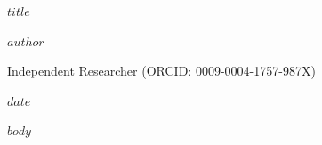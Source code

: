 \documentclass[11pt,letterpaper]{article}
\theoremstyle{definition}
\begin{document}
\thispagestyle{plain}
\begin{center}
{\fontsize{17.5}{22}\selectfont\bfseries $title$\par}
\vspace{11pt}
{\large $author$\par}
\vspace{3pt}
{\small Independent Researcher (ORCID: \href{https://orcid.org/0009-0004-1757-987X}{0009-0004-1757-987X})\par}
\vspace{5pt}
{\small $date$\par}
\end{center}
\vspace{4pt}
\begin{abstract}
\noindent $abstract$
\end{abstract}
\vspace{6pt}
\vspace{10pt}

$body$

\vspace{12pt}
\begingroup
{}
\small
\setlength{\bibsep}{3.0pt}


\endgroup
\end{document}
